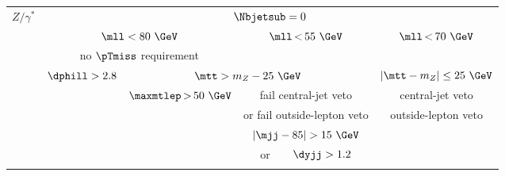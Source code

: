\begin{tabular}{c|| c | c | c | c}
    \hline\hline
    \multirow{8}{*}{$Z/\gamma^{\ast}$}  & \multicolumn{4}{c}{\phantom{ccccc}$\Nbjetsub=0$}                                                                                                                                       \\ \cline{2-5}
                                        & \multicolumn{2}{c|}{\phantom{ccccc}$\mll < 80~\GeV$} & $\mll\,{<}\,55~\GeV$                                          & $\mll\,{<}\,70~\GeV$                                            \\\
                                        & \multicolumn{2}{c|}{no $\pTmiss$ requirement}        &                                                               &                                                                 \\\cline{2-4}
                                        & $\dphill > 2.8$                                      & \multicolumn{2}{c|}{$\mtt > m_Z - 25~\GeV$}                   & $|\mtt - m_Z| \leq 25~\GeV$                                     \\ \cline{3-4}
                                        &                                                      & $\maxmtlep\,{>}\,50~\GeV$                                     & fail central-jet veto          & central-jet veto               \\
                                        &                                                      &                                                               & or fail outside-lepton veto    & outside-lepton veto            \\ \cline{4-4}
                                        &                                                      &                                                               & $|\mjj-85| > 15~\GeV$          &                                \\
                                        &                                                      &                                                               & or\ \ \ \ $\dyjj > 1.2$        &                                \\
    \dbline
\end{tabular}
